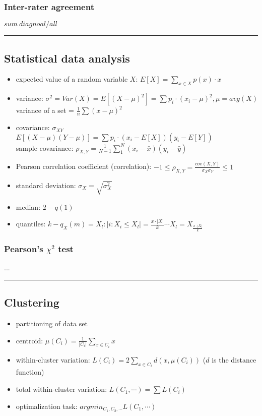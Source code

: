 \documentclass[a4paper]{article}
\newcommand{\tab}{\hspace{1cm}}
\begin{document}
\subsubsection*{Inter-rater agreement}
$ sum\ diagnoal/all$

\noindent\rule{\textwidth}{1pt}

\subsection*{Statistical data analysis}
\begin{itemize}
\item expected value of a random variable $X$: $E[X] = \sum_{x \in X} p(x) \cdot x$
\item variance: $\sigma^2 = Var(X) = E[(X-\mu)^2] = \sum p_i \cdot (x_i - \mu)^2, \mu = avg(X)$ \\
    \tab variance of a set = $\frac{1}{n} \sum (x-\mu)^2$
\item covariance: $\sigma_{XY}$ \\
    \text{} \tab $E[(X-\mu)(Y-\mu)] = \sum p_i \cdot (x_i - E[X])(y_i - E[Y])$ \\
    \text{} \tab sample covariance: $\rho_{X,Y} = \frac{1}{N-1}\sum_1^N (x_i - \bar{x})(y_i - \bar{y})$

\item Pearson correlation coefficient (correlation): $ -1 \le \rho_{X,Y} = \frac{cov(X,Y)}{\sigma_X \sigma_Y} \le 1$
\item standard deviation: $\sigma_X = \sqrt{\sigma_X^2}$
\item median: $ 2-q(1) $
\item quantiles: $ k-q_X(m) = X_l: |{i: X_i \le X_l}| = \frac{x\cdot |X|}{k} \cdots X_l = X_{\frac{x\cdot |X|}{k}} $
\end{itemize}

\subsubsection*{Pearson's $\chi^2$ test}
...

\noindent\rule{\textwidth}{1pt}

\subsection*{Clustering}
\begin{itemize}
\item partitioning of data set
\item centroid: $\mu(C_i) = \frac{1}{|C_i|} \sum_{x \in C_i} x$
\item within-cluster variation: $L(C_i) = 2 \sum_{x \in C_i} d(x, \mu(C_i))$ ($d$ is the distance function)
\item total within-cluster variation: $L(C_1, \cdots ) = \sum L(C_i)$
\item optimalization task: $argmin_{C_1, C_2, \cdots} L(C_1, \cdots)$
\end{itemize}
\end{document}
